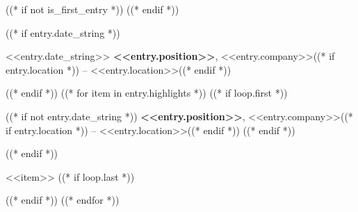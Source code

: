 ((* if not is_first_entry *))
\vspace{<<design.margins.entry_area.vertical_between>>}
((* endif *))

((* if entry.date_string *))
\begin{twocolentry}{
    <<entry.date_string>>
}
    \textbf{<<entry.position>>}, <<entry.company>>((* if entry.location *)) -- <<entry.location>>((* endif *))
\end{twocolentry}

\vspace{<<design.margins.highlights_area.top>>}
((* endif *))
((* for item in entry.highlights *))
    ((* if loop.first *))
\begin{onecolentry}
        ((* if not entry.date_string *))
    \textbf{<<entry.position>>}, <<entry.company>>((* if entry.location *)) -- <<entry.location>>((* endif *))
        ((* endif *))
    \begin{highlights}
    ((* endif *))
        \item <<item>>
    ((* if loop.last *))
    \end{highlights}
\end{onecolentry}
    ((* endif *))
((* endfor *))
